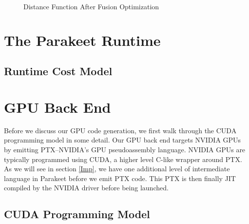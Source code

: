 \documentclass[preprint]{sigplanconf}
\begin{document}
\begin{figure}[h!]

\caption{Distance Function After Fusion Optimization}
\label{DistFuse}
\end{figure}

\section{The Parakeet Runtime}
\label{runtime}



\subsection{Runtime Cost Model}
\label{costmodel}



\section{GPU Back End}
Before we discuss our GPU code generation, we first walk through the CUDA
programming model in some detail.  Our GPU back end targets NVIDIA GPUs by
emitting PTX--NVIDIA's GPU pseudoassembly language.  NVIDIA GPUs are typically
programmed using CUDA, a higher level C-like wrapper around PTX.  As we will
see in section \ref{Imp}, we have one additional level of intermediate language
in Parakeet before we emit PTX code.  This PTX is then finally JIT compiled by
the NVIDIA driver before being launched.

\subsection{CUDA Programming Model}
\end{document}
